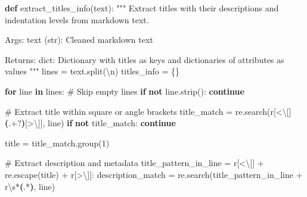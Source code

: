 \documentclass[
  11pt,
  letterpaper,
]{book}
\newenvironment{Shaded}{\begin{snugshade}}{\end{snugshade}}
\newcommand{\CharTok}[1]{\textcolor[rgb]{0.13,0.47,0.30}{#1}}
\newcommand{\CommentTok}[1]{\textcolor[rgb]{0.37,0.37,0.37}{#1}}
\newcommand{\ControlFlowTok}[1]{\textcolor[rgb]{0.00,0.23,0.31}{\textbf{#1}}}
\newcommand{\DecValTok}[1]{\textcolor[rgb]{0.68,0.00,0.00}{#1}}
\newcommand{\KeywordTok}[1]{\textcolor[rgb]{0.00,0.23,0.31}{\textbf{#1}}}
\newcommand{\NormalTok}[1]{\textcolor[rgb]{0.00,0.23,0.31}{#1}}
\newcommand{\OperatorTok}[1]{\textcolor[rgb]{0.37,0.37,0.37}{#1}}
\newcommand{\PreprocessorTok}[1]{\textcolor[rgb]{0.68,0.00,0.00}{#1}}
\newcommand{\StringTok}[1]{\textcolor[rgb]{0.13,0.47,0.30}{#1}}
\newcommand{\VerbatimStringTok}[1]{\textcolor[rgb]{0.13,0.47,0.30}{#1}}
\begin{document}
\begin{Shaded}
\begin{Highlighting}[]
\KeywordTok{def}\NormalTok{ extract\_titles\_info(text):}
    \CommentTok{"""}
\CommentTok{    Extract titles with their descriptions and indentation levels from markdown text.}

\CommentTok{    Args:}
\CommentTok{        text (str): Cleaned markdown text}

\CommentTok{    Returns:}
\CommentTok{        dict: Dictionary with titles as keys and dictionaries of attributes as values}
\CommentTok{    """}
\NormalTok{    lines }\OperatorTok{=}\NormalTok{ text.split(}\StringTok{\textquotesingle{}}\CharTok{\textbackslash{}n}\StringTok{\textquotesingle{}}\NormalTok{)}
\NormalTok{    titles\_info }\OperatorTok{=}\NormalTok{ \{\}}

    \ControlFlowTok{for}\NormalTok{ line }\KeywordTok{in}\NormalTok{ lines:}
        \CommentTok{\# Skip empty lines}
        \ControlFlowTok{if} \KeywordTok{not}\NormalTok{ line.strip():}
            \ControlFlowTok{continue}

        \CommentTok{\# Extract title within square or angle brackets}
\NormalTok{        title\_match }\OperatorTok{=}\NormalTok{ re.search(}\VerbatimStringTok{r\textquotesingle{}}\PreprocessorTok{[\textless{}}\CharTok{\textbackslash{}[}\PreprocessorTok{]}\KeywordTok{(}\DecValTok{.}\OperatorTok{+?}\KeywordTok{)}\PreprocessorTok{[\textgreater{}}\CharTok{\textbackslash{}]}\PreprocessorTok{]}\VerbatimStringTok{\textquotesingle{}}\NormalTok{, line)}
        \ControlFlowTok{if} \KeywordTok{not}\NormalTok{ title\_match:}
            \ControlFlowTok{continue}

\NormalTok{        title }\OperatorTok{=}\NormalTok{ title\_match.group(}\DecValTok{1}\NormalTok{)}

        \CommentTok{\# Extract description and metadata}
\NormalTok{        title\_pattern\_in\_line }\OperatorTok{=} \VerbatimStringTok{r\textquotesingle{}}\PreprocessorTok{[\textless{}}\CharTok{\textbackslash{}[}\PreprocessorTok{]}\VerbatimStringTok{\textquotesingle{}} \OperatorTok{+}\NormalTok{ re.escape(title) }\OperatorTok{+} \VerbatimStringTok{r\textquotesingle{}}\PreprocessorTok{[\textgreater{}}\CharTok{\textbackslash{}]}\PreprocessorTok{]}\VerbatimStringTok{:\textquotesingle{}}
\NormalTok{        description\_match }\OperatorTok{=}\NormalTok{ re.search(title\_pattern\_in\_line }\OperatorTok{+} \VerbatimStringTok{r\textquotesingle{}}\DecValTok{\textbackslash{}s}\OperatorTok{*}\KeywordTok{(}\DecValTok{.}\OperatorTok{*}\KeywordTok{)}\VerbatimStringTok{\textquotesingle{}}\NormalTok{, line)}


\end{Highlighting}
\end{Shaded}
\end{document}
